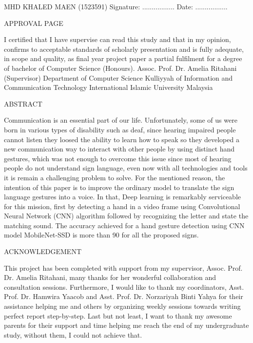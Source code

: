 \documentclass[12pt]{report}
\begin{document}
\mbox{}
\vfill
MHD KHALED MAEN (1523591)
\bigbreak
Signature: .................\hspace{18em} Date: .................
\bigbreak

\newpage
\begin{center}
    \LARGE APPROVAL PAGE
\end{center} 

I certified that I have supervise can read this study and that in my opinion,
confirms to acceptable standards of scholarly presentation and is fully adequate,
in scope and quality, as final year project paper a partial fulfilment for a 
degree of bachelor of Computer Science (Honours).
\mbox{}
\vfill
Assoc. Prof. Dr. Amelia Ritahani (Supervisor)
\bigbreak
Department of Computer Science
\bigbreak
Kulliyyah of Information and Communication Technology
\bigbreak
International Islamic University Malaysia
\bigbreak

\newpage

\begin{center}
    \LARGE ABSTRACT
\end{center}

    Communication is an essential part of our life. Unfortunately, 
    some of us were born in various types of disability such as deaf, 
    since hearing impaired people cannot listen they loosed the ability 
    to learn how to speak so they developed a new communication way to 
    interact with other people by using distinct hand gestures, which was 
    not enough  to overcome this issue since most of hearing people do not 
    understand sign language, even now with all technologies and tools it 
    is remain a challenging problem to solve. For the mentioned reason, 
    the intention of this paper is to improve the ordinary model to translate
    the sign language gestures into a voice. In that, Deep learning is remarkably 
    serviceable for this mission, first by detecting a hand in a video frame using
    Convolutional Neural Network (CNN) algorithm followed by recognizing the 
    letter and state the matching sound. The accuracy achieved for a hand gesture
    detection using CNN model MobileNet-SSD is more than 90 \text{\%} for all the
    proposed signs.


\newpage
\begin{center}
    \LARGE ACKNOWLEDGEMENT
\end{center} 

This project has been completed with support from my supervisor,
Assoc. Prof. Dr. Amelia Ritahani, many thanks for her wonderful 
collaboration and consultation sessions. Furthermore, 
I would like to thank my coordinators, Asst. Prof. Dr. Hamwira Yaacob and 
Asst. Prof. Dr. Norzariyah Binti Yahya for their assistance helping me and 
others by organizing weekly sessions towards writing perfect report step-by-step. 
Last but not least, I want to thank my awesome parents for their support and time 
helping me reach the end of my undergraduate study, without them, I could not achieve that.
\end{document}
